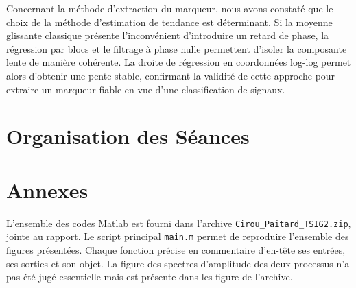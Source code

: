 \documentclass[11pt,a4paper]{article}
\begin{document}
Concernant la méthode d'extraction du marqueur, nous avons constaté que le choix de la méthode d'estimation de tendance est déterminant. Si la moyenne glissante classique présente l'inconvénient d'introduire un retard de phase, la régression par blocs et le filtrage à phase nulle permettent d'isoler la composante lente de manière cohérente. La droite de régression en coordonnées log-log permet alors d'obtenir une pente stable, confirmant la validité de cette approche pour extraire un marqueur fiable en vue d'une classification de signaux.


\section{Organisation des Séances}

\section{Annexes}

L'ensemble des codes Matlab est fourni dans l'archive
\texttt{Cirou\_Paitard\_TSIG2.zip}, jointe au rapport. Le script principal
\texttt{main.m} permet de reproduire l'ensemble des figures présentées. Chaque fonction
précise en commentaire d'en-tête ses entrées, ses sorties et son objet.
La figure des spectres d'amplitude des deux processus n'a pas été jugé essentielle mais est présente dans les figure de l'archive.
\end{document}
